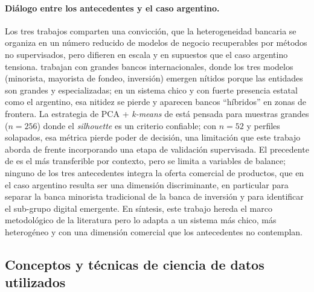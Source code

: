 \documentclass[11pt,a4paper]{article}
\begin{document}
\paragraph{Diálogo entre los antecedentes y el caso argentino.}
Los tres trabajos comparten una convicción, que la heterogeneidad bancaria se organiza en un número reducido de modelos de negocio recuperables por métodos no supervisados, pero difieren en escala y en supuestos que el caso argentino tensiona. \citet{roengpitya2014} trabajan con grandes bancos internacionales, donde los tres modelos (minorista, mayorista de fondeo, inversión) emergen nítidos porque las entidades son grandes y especializadas; en un sistema chico y con fuerte presencia estatal como el argentino, esa nitidez se pierde y aparecen bancos ``híbridos'' en zonas de frontera. La estrategia de PCA + \textit{k-means} de \citet{mercadier2025} está pensada para muestras grandes ($n = 256$) donde el \textit{silhouette} es un criterio confiable; con $n = 52$ y perfiles solapados, esa métrica pierde poder de decisión, una limitación que este trabajo aborda de frente incorporando una etapa de validación supervisada. El precedente de \citet{chherawala2025} es el más transferible por contexto, pero se limita a variables de balance; ninguno de los tres antecedentes integra la oferta comercial de productos, que en el caso argentino resulta ser una dimensión discriminante, en particular para separar la banca minorista tradicional de la banca de inversión y para identificar el sub-grupo digital emergente. En síntesis, este trabajo hereda el marco metodológico de la literatura pero lo adapta a un sistema más chico, más heterogéneo y con una dimensión comercial que los antecedentes no contemplan.

\subsection{Conceptos y técnicas de ciencia de datos utilizados}
\end{document}
